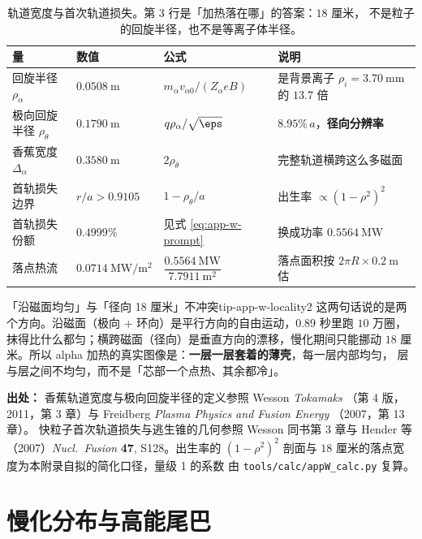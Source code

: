 \begin{table}[htbp]
\centering
\caption{轨道宽度与首次轨道损失。第 3 行是「加热落在哪」的答案：$18$ 厘米，
不是粒子的回旋半径，也不是等离子体半径。}
\label{tab:app-w-orbit}
\begin{tabular}{@{}p{2.7cm}p{2.6cm}p{3.0cm}p{4.2cm}@{}}
\hline
量 & 数值 & 公式 & 说明 \\
\hline
回旋半径 $\rho_\alpha$ & $0.0508\ \mathrm{m}$ & $m_\alpha v_{\alpha 0}/(Z_\alpha eB)$ &
是背景离子 $\rho_i=3.70\ \mathrm{mm}$ 的 $13.7$ 倍 \\
极向回旋半径 $\rho_\theta$ & $0.1790\ \mathrm{m}$ & $q\rho_\alpha/\sqrt{\eps}$ &
$8.95\%\,a$，\textbf{径向分辨率} \\
香蕉宽度 $\Delta_\alpha$ & $0.3580\ \mathrm{m}$ & $2\rho_\theta$ &
完整轨道横跨这么多磁面 \\
首轨损失边界 & $r/a>0.9105$ & $1-\rho_\theta/a$ &
出生率 $\propto(1-\rho^2)^2$ \\
首轨损失份额 & $0.4999\%$ & 见式 \eqref{eq:app-w-prompt} &
换成功率 $0.5564\ \mathrm{MW}$ \\
落点热流 & $0.0714\ \mathrm{MW/m^2}$ &
$\dfrac{0.5564\ \mathrm{MW}}{7.7911\ \mathrm{m^2}}$ &
落点面积按 $2\pi R\times0.2\ \mathrm{m}$ 估 \\
\hline
\end{tabular}

\end{table}

\begin{tip}{「沿磁面均匀」与「径向 18 厘米」不冲突}{tip-app-w-locality2}
这两句话说的是两个方向。沿磁面（极向 + 环向）是平行方向的自由运动，$0.89$ 秒里跑
$10$ 万圈，抹得比什么都匀；横跨磁面（径向）是垂直方向的漂移，慢化期间只能挪动
$18$ 厘米。所以 alpha 加热的真实图像是：\textbf{一层一层套着的薄壳}，每一层内部均匀，
层与层之间不均匀，而不是「芯部一个点热、其余都冷」。
\end{tip}

{\footnotesize
\textbf{出处：} 香蕉轨道宽度与极向回旋半径的定义参照 Wesson \textit{Tokamaks}
（第 4 版，2011，第 3 章）与 Freidberg \textit{Plasma Physics and Fusion Energy}
（2007，第 13 章）。
快粒子首次轨道损失与逃生锥的几何参照 Wesson 同书第 3 章与
Hender 等（2007）\textit{Nucl.\ Fusion} \textbf{47}, S128。出生率的
$(1-\rho^2)^2$ 剖面与 $18$ 厘米的落点宽度为本附录自拟的简化口径，量级 1 的系数
由 \texttt{tools/\allowbreak{}calc/\allowbreak{}appW\_calc.py} 复算。
}

\section{慢化分布与高能尾巴}
\label{sec:app-w-tail}

